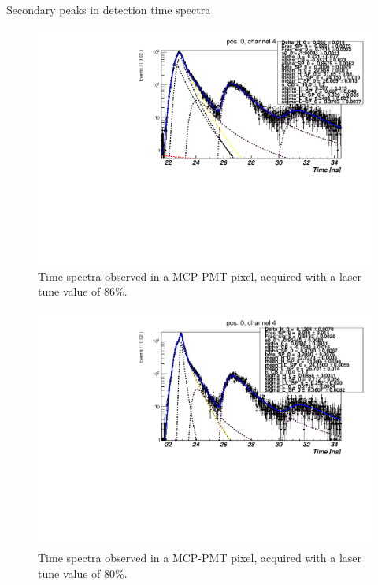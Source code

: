 \documentclass[a4paper,11pt]{article}
\begin{document}
\begin{subsection}{Secondary peaks in detection time spectra}
\begin{figure}
\begin{center}
\includegraphics[scale=0.5]{plots/ch4_T86}
\caption{Time spectra observed in a MCP-PMT pixel, acquired with a laser tune value of 86\%.}
\label{fig:SP_MCPPMT_T86}
\end{center}
\end{figure}

\begin{figure}
\begin{center}
\includegraphics[scale=0.5]{plots/ch4_T80}
\caption{Time spectra observed in a MCP-PMT pixel, acquired with a laser tune value of 80\%.}
\label{fig:SP_MCPPMT_T80}
\end{center}
\end{figure}



\end{subsection}
\end{document}
